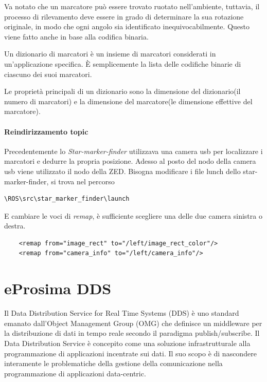\documentclass[a4paper]{article}
\begin{document}
Va notato che un marcatore può essere trovato ruotato nell'ambiente, tuttavia, il processo di rilevamento deve essere in grado di determinare la sua rotazione originale, in modo che ogni angolo sia identificato inequivocabilmente. Questo viene fatto anche in base alla codifica binaria.

Un dizionario di marcatori è un insieme di marcatori considerati in un'applicazione specifica. È semplicemente la lista delle codifiche binarie di ciascuno dei suoi marcatori.

Le proprietà principali di un dizionario sono la dimensione del dizionario(il numero di marcatori) e la dimensione del marcatore(le dimensione effettive del marcatore).
\paragraph{Reindirizzamento topic}
Precedentemente lo \textit{Star-marker-finder} utilizzava una camera usb per localizzare i marcatori e dedurre la propria posizione. Adesso al posto del nodo della camera usb viene utilizzato il nodo della ZED.
Bisogna modificare i file lunch dello star-marker-finder, si trova nel percorso
\begin{verbatim}
\ROS\src\star_marker_finder\launch
\end{verbatim}
E cambiare le voci di \textit{remap}, è sufficiente scegliere una delle due camera sinistra o destra.
\begin{verbatim}
    <remap from="image_rect" to="/left/image_rect_color"/>
    <remap from="camera_info" to="/left/camera_info"/>
\end{verbatim}

\newpage
\section{eProsima DDS}

Il Data Distribution Service for Real Time Systems (DDS) è uno standard emanato dall'Object Management Group (OMG) che definisce un middleware per la distribuzione di dati in tempo reale secondo il paradigma publish/subscribe.
Il Data Distribution Service è concepito come una soluzione infrastrutturale alla programmazione di applicazioni incentrate sui dati. Il suo scopo è di nascondere interamente le problematiche della gestione della comunicazione nella programmazione di applicazioni data-centric.
\end{document}
